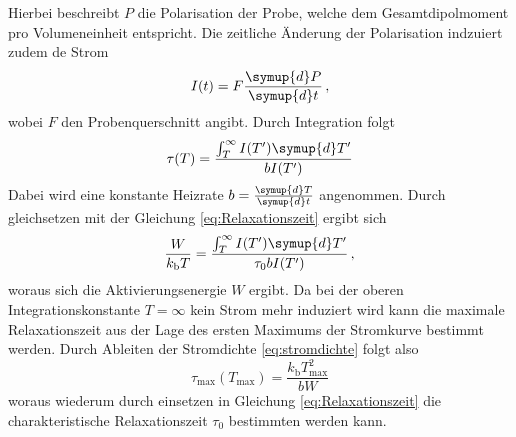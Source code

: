 Hierbei beschreibt $P$ die Polarisation der Probe, welche dem Gesamtdipolmoment pro Volumeneinheit entspricht.
Die zeitliche Änderung der Polarisation indzuiert zudem de Strom
\begin{equation}
    I(t) = F\frac{\symup{d}P}{\symup{d}t} \, ,
\end{equation}
wobei $F$ den Probenquerschnitt angibt.
Durch Integration folgt 
\begin{equation}
    \tau(T) = \frac{ \int_{T}^{\infty} I(T')\symup{d}T'}{bI(T')}
\end{equation}
Dabei wird eine konstante Heizrate $b = \frac{\symup{d}T}{\symup{d}t}$ angenommen.
Durch gleichsetzen mit der Gleichung \eqref{eq:Relaxationszeit} ergibt sich
\begin{equation}
    \frac{W}{k_\text{b}T} = \frac{ \int_{T}^{\infty} I(T')\symup{d}T'}{\tau_0 b I(T')} \, ,
\end{equation}
woraus sich die Aktivierungsenergie $W$ ergibt.
Da bei der oberen Integrationskonstante $T=\infty$ kein Strom mehr induziert wird kann die maximale Relaxationszeit aus der Lage des ersten Maximums der Stromkurve bestimmt werden.
Durch Ableiten der Stromdichte \eqref{eq:stromdichte} folgt also
\begin{equation}
    \tau _\text{max}(T_\text{max}) = \frac{k_\text{b} T_\text{max} ^2}{bW}
\end{equation}
woraus wiederum durch einsetzen in Gleichung \eqref{eq:Relaxationszeit} die charakteristische Relaxationszeit $\tau_0$ bestimmten werden kann.


